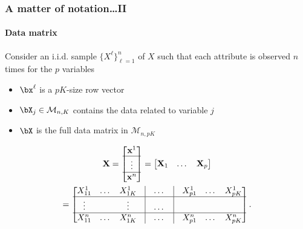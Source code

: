 \begin{frame}
  \frametitle{A matter of notation\dots II}
  \framesubtitle{Data matrix}

  Consider an i.i.d.  sample $\{X^\ell\}_{\ell=1}^n$ of $X$ such that
   each attribute is observed $n$ times for the $p$ variables

  \begin{itemize}
    \item $\bx^\ell$ is a $pK$-size row vector
    \item $\bX_j \in \mathcal{M}_{n,K}$ contains the data related to variable $j$ 
    \item $\bX$ is the full data matrix in $\mathcal{M}_{n,pK}$
  \end{itemize}

\begin{multline*}
  \mathbf{X} = \begin{bmatrix}
    \mathbf{x}^1 \\ \hline
    \vdots \\\hline
    \mathbf{x}^n \\
  \end{bmatrix}
  = \begin{bmatrix}
    \mathbf{X}_1 & \dots & \mathbf{X}_p \\
  \end{bmatrix} \\
  = \begin{bmatrix}
    X_{11}^1 & \dots & X_{1K}^1 & \vline & \dots & \vline & X_{p1}^1 & \dots & X_{pK}^1 \\ \hline
    \vdots & & \vdots & \vline & \dots & \vline & & & \\ \hline
    X_{11}^n & \dots & X_{1K}^n & \vline & \dots & \vline & X_{p1}^n & \dots & X_{pK}^n \\ 
  \end{bmatrix}.
\end{multline*}
\end{frame}

